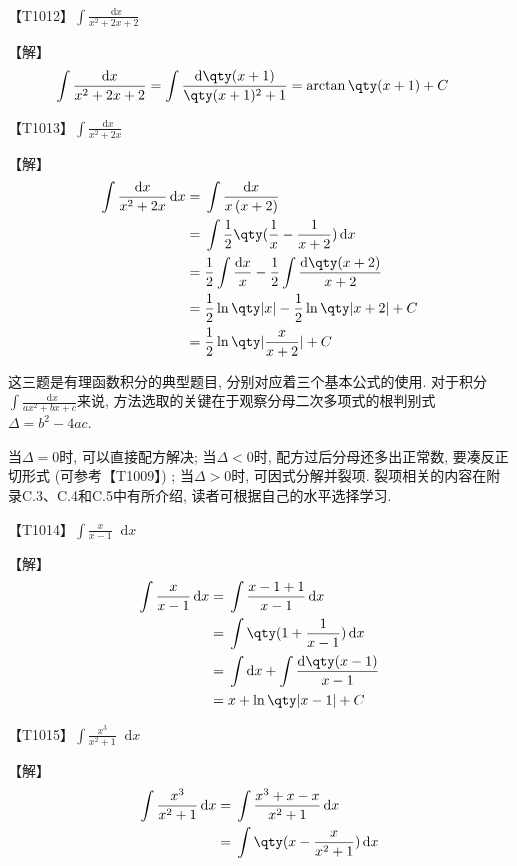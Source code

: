 \documentclass{ctexbook}
\newcommand*{\dif}{\mathop{}\!\mathrm{d}}
\begin{document}
{\begin{align*}
\end{align*}\par
{\color{red}【T1012】}$\int\frac{\dif{x}}{x^{2}+2x+2}$\par
【解】
\begin{align*}
\int\frac{\dif{x}}{x^{2}+2x+2}&=\int\frac{\dif{\qty(x+1)}}{\qty(x+1)^{2}+1}=\arctan{\qty(x+1)}+C
\end{align*}\par
{\color{red}【T1013】}$\int\frac{\dif{x}}{x^{2}+2x}$\par
【解】
\begin{align*}
\int\frac{\dif{x}}{x^{2}+2x}\dif{x}={}&\int\frac{\dif{x}}{x\left(x+2\right)}\\
={}&\int\frac{1}{2}\qty(\frac{1}{x}-\frac{1}{x+2})\dif{x}\\
={}&\frac{1}{2}\int\frac{\dif{x}}{x}-\frac{1}{2}\int\frac{\dif{\qty(x+2)}}{x+2}\\
={}&\frac{1}{2}\ln\qty|x|-\frac{1}{2}\ln\qty|x+2|+C\\
={}&\frac{1}{2}\ln\qty|\frac{x}{x+2}|+C
\end{align*}\par
{\kaishu 这三题是有理函数积分的典型题目, 分别对应着三个基本公式的使用. 对于积分\\$\int\frac{\dif{x}}{ax^{2}+bx+c}$来说, 方法选取的关键在于观察分母二次多项式的根判别式$\Delta=b^{2}-4ac$. \par
当$\Delta=0$时, 可以直接配方解决; 当$\Delta<0$时, 配方过后分母还多出正常数, 要凑反正切形式 (可参考{\color{red}【T1009】}) ; 当$\Delta>0$时, 可因式分解并裂项. 裂项相关的内容在附录C.3、C.4和C.5中有所介绍, 读者可根据自己的水平选择学习. \par}
{\color{red}【T1014】}$\int\frac{x}{x-1}\dif{x}$\par
【解】
\begin{align*}
\int\frac{x}{x-1}\dif{x}={}&\int\frac{x-1+1}{x-1}\dif{x}\\
={}&\int\qty(1+\frac{1}{x-1})\dif{x}\\
={}&\int\dif{x}+\int\frac{\dif{\qty(x-1)}}{x-1}\\
={}&x+\ln\qty|x-1|+C
\end{align*}\par
{\color{red}【T1015】}$\int\frac{x^{3}}{x^{2}+1}\dif{x}$\par
【解】
\begin{align*}
\int\frac{x^{3}}{x^{2}+1}\dif{x}={}&\int\frac{x^{3}+x-x}{x^{2}+1}\dif{x}\\
={}&\int\qty(x-\frac{x}{x^{2}+1})\dif{x}\\

\end{align*}}
\end{document}
